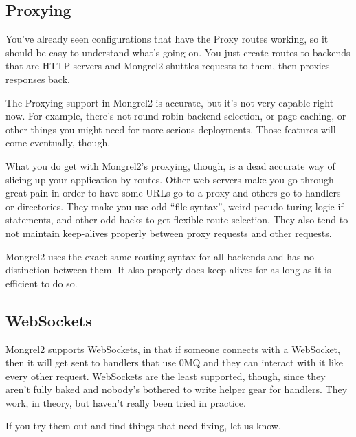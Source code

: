 \subsection{Proxying}

You've already seen configurations that have the Proxy routes working, so it should
be easy to understand what's going on.  You just create routes to backends that are
HTTP servers and Mongrel2 shuttles requests to them, then proxies responses back.

The Proxying support in Mongrel2 is accurate, but it's not very capable right now.  For
example, there's not round-robin backend selection, or page caching, or other things you
might need for more serious deployments.  Those features will come eventually, though.

What you do get with Mongrel2's proxying, though, is a dead accurate way of slicing up
your application by routes.  Other web servers make you go through great pain in order
to have some URLs go to a proxy and others go to handlers or directories.  They make you
use odd ``file syntax'', weird pseudo-turing logic if-statements, and other odd hacks
to get flexible route selection.  They also tend to not maintain keep-alives properly
between proxy requests and other requests.

Mongrel2 uses the exact same routing syntax for all backends and has no distinction between
them.  It also properly does keep-alives for as long as it is efficient to do so.


\subsection{WebSockets}

Mongrel2 supports WebSockets, in that if someone connects with a WebSocket, then it will get
sent to handlers that use 0MQ and they can interact with it like every other request.  WebSockets
are the least supported, though, since they aren't fully baked and nobody's bothered to write
helper gear for handlers.  They work, in theory, but haven't really been tried in practice.

If you try them out and find things that need fixing, let us know.

